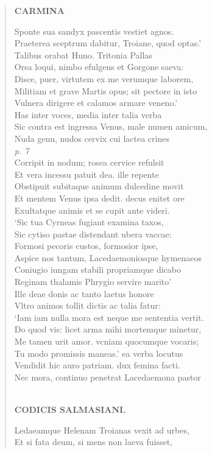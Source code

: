 \documentclass[11pt, a4paper]{report}
\begin{document}
\begin{verse}
    \begin{center} \textbf{CARMINA} \end{center} \marginpar{[40]} Sponte sua sandyx pascentis vestiet agnos. \\ Praeterea sceptrum dabitur, Troiane, quod optas.’ \\ Talibus orabat Huno. Tritonia Pallas \\ Orsa loqui, nimbo efulgens et Gorgone saeva: \\ Disce, puer, virtutem ex me verumque laborem, \\ Militiam et grave Martis opus; sit pectore in isto \\ Vulnera dirigere et calamos armare veneno.’ \\ Has inter voces, media inter talia verba \\ Sic contra est ingressa Venus, male numen amicum, \\ Nuda genu, nudos cervix cui lactea crines \\ \textit{p. 7} \\ Corripit in nodum; rosea cervice refulsit \\ Et vera incessu patuit dea. ille repente \\ Obstipuit subitaque animum dulcedine movit \\ Et mentem Venus ipsa dedit. decus enitet ore \\ Exultatque animis et se cupit ante videri. \\ ‘Sic tua Cyrneas fugiant examina taxos, \\ Sic cytiso pastae distendant ubera vaccae: \\ Formosi pecoris custos, formosior ipse, \\ Aspice nos tantum, Lacedaemoniosque hymenaeos \\ Coniugio iungam stabili propriamque dicabo \\ Reginam thalamis Phrygio servire marito’ \\ Ille deae donis ac tanto laetus honore \\ Vltro animos tollit dictis ac talia fatur: \\ ‘Iam iam nulla mora est neque me sententia vertit. \\ Do quod vis: licet arma mihi mortemque minetur, \\ Me tamen urit amor. vcniam quocumque vocaris; \\ Tu modo promissis maneas.’ ea verba locutus \\ Vendidit hic auro patriam. dux femina facti. \\ Nec mora, continuo penetrat Lacedaemona pastor \\ 
        ﻿\pagebreak 
    \begin{center} \textbf{CODICIS SALMASIANI.} \end{center} \marginpar{[41]} Ledaeamque Helenam Troianas vexit ad urbes, \\ Et si fata deum, si mens non laeva fuisset, \\ 
      \end{verse}
  
\end{document}
